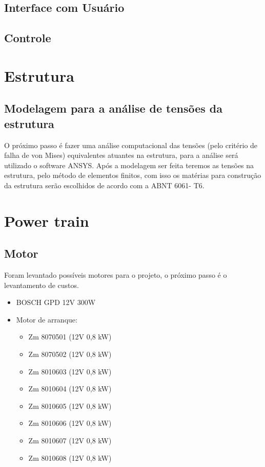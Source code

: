   \subsection{Interface com Usuário}
  \subsection{Controle}

\section{Estrutura}

\subsection{Modelagem para a análise de tensões da estrutura}

O próximo passo é fazer uma análise computacional das tensões (pelo critério de falha de von Mises) equivalentes atuantes na estrutura, para a análise  será utilizado o software ANSYS. Após a modelagem ser feita teremos as tensões na estrutura, pelo método de elementos finitos, com isso os matérias para construção da estrutura serão escolhidos de acordo com a  ABNT 6061- T6.

\section{Power train}

\subsection{Motor}

Foram levantado possíveis motores para o projeto, o próximo passo é o levantamento de custos.

\begin{itemize}
 \item BOSCH GPD 12V 300W
 \item Motor de arranque:
  \begin{itemize}
    \item Zm 8070501 (12V 0,8 kW)
    \item Zm 8070502 (12V 0,8 kW)
    \item Zm 8010603 (12V 0,8 kW)
    \item Zm 8010604 (12V 0,8 kW)
    \item Zm 8010605 (12V 0,8 kW)
    \item Zm 8010606 (12V 0,8 kW)
    \item Zm 8010607 (12V 0,8 kW)
    \item Zm 8010608 (12V 0,8 kW)
  \end{itemize}
\end{itemize}

